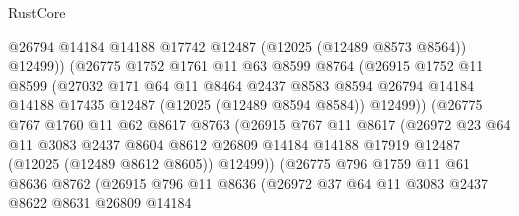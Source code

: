\begin{lexlean}{RustCore}
\begin{coremodule}
                        @26794
                        @14184
                        @14188
                        @17742
                        @12487
                        (@12025 (@12489 @8573 @8564))
                        @12499))
                    (@26775
                      @1752
                      @1761
                      @11
                      @63
                      @8599
                      @8764
                      (@26915
                        @1752
                        @11
                        @8599
                        (@27032
                          @171
                          @64
                          @11
                          @8464
                          @2437
                          @8583
                          @8594
                          @26794
                          @14184
                          @14188
                          @17435
                          @12487
                          (@12025 (@12489 @8594 @8584))
                          @12499))
                      (@26775
                        @767
                        @1760
                        @11
                        @62
                        @8617
                        @8763
                        (@26915
                          @767
                          @11
                          @8617
                          (@26972
                            @23
                            @64
                            @11
                            @3083
                            @2437
                            @8604
                            @8612
                            @26809
                            @14184
                            @14188
                            @17919
                            @12487
                            (@12025 (@12489 @8612 @8605))
                            @12499))
                        (@26775
                          @796
                          @1759
                          @11
                          @61
                          @8636
                          @8762
                          (@26915
                            @796
                            @11
                            @8636
                            (@26972
                              @37
                              @64
                              @11
                              @3083
                              @2437
                              @8622
                              @8631
                              @26809
                              @14184

\end{coremodule}
\end{lexlean}
